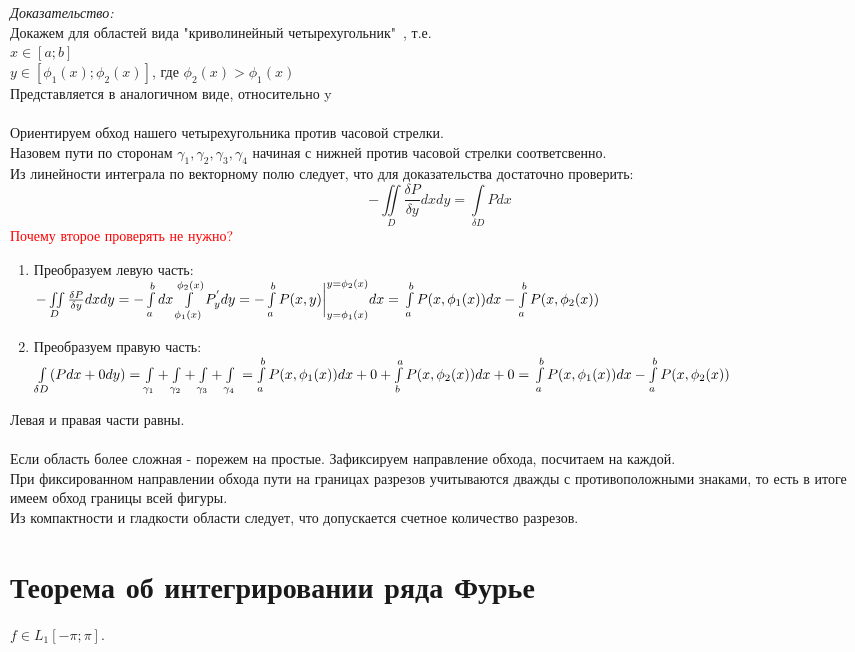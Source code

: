 \documentclass[paper=a4, fontsize=14pt]{report}
\begin{document}
        
        \emph{Доказательство:} \\
Докажем для областей вида "криволинейный четырехугольник"\ , т.е. \\
$x \in [a;b]$ \\
$y \in [\phi_1(x);\phi_2(x)]$, где $\phi_2(x) > \phi_1(x)$ \\
Представляется в аналогичном виде, относительно y \\\\
Ориентируем обход нашего четырехугольника против часовой стрелки.\\
Назовем пути по сторонам $\gamma_1, \gamma_2, \gamma_3, \gamma_4$ начиная с нижней против часовой стрелки соответсвенно. \\
Из линейности интеграла по векторному полю следует, что для доказательства достаточно проверить: $$-\iint\limits_{D} \frac{\delta P}{\delta y}dxdy = \int\limits_{\delta D}Pdx$$ \textcolor{red}{Почему второе проверять не нужно?}
\begin{enumerate}
	\item Преобразуем левую часть:\\
		$-\iint\limits_{D} \frac{\delta P}{\delta y}dxdy = - \int\limits_{a}^bdx\int\limits_{\phi_1(x)}^{\phi_2(x)}P^{'}_ydy = -\int\limits_{a}^bP(x,y)\bigg|_{y=\phi_1(x)}^{y=\phi_2(x)}dx =\\ \int\limits_{a}^bP(x,\phi_1(x))dx - \int\limits_{a}^bP(x,\phi_2(x))$
	\item Преобразуем правую часть: \\
		$\int\limits_{\delta D}(Pdx + 0dy) = \int\limits_{\gamma_1}+\int\limits_{\gamma_2}+\int\limits_{\gamma_3}+\int\limits_{\gamma_4} \\ = \int\limits_{a}^bP(x,\phi_1(x))dx + 0 + \int\limits_{b}^aP(x, \phi_2(x))dx + 0 = \\ \int\limits_{a}^bP(x,\phi_1(x))dx - \int\limits_{a}^bP(x,\phi_2(x))$
\end{enumerate}
Левая и правая части равны. \\\\
Если область более сложная - порежем на простые. Зафиксируем направление обхода, посчитаем на каждой. \\
При фиксированном направлении обхода пути на границах разрезов учитываются дважды с противоположными знаками, то есть в итоге имеем обход границы всей фигуры.\\
Из компактности и гладкости области следует, что допускается счетное количество разрезов.

    \section{Теорема об интегрировании ряда Фурье}
    $f \in L_1[-\pi;\pi]$.
\end{document}
